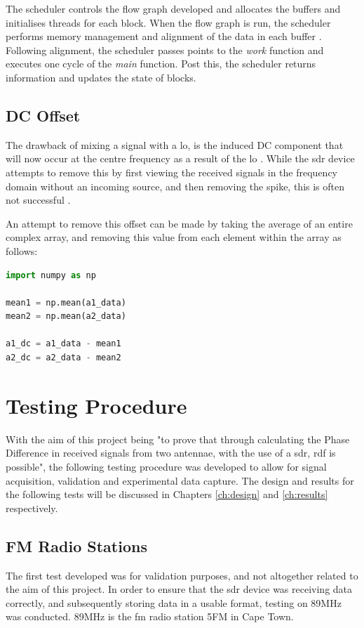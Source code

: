\documentclass[class=report,11pt,crop=false]{standalone}
\begin{document}
The scheduler controls the flow graph developed and allocates the buffers and initialises threads for each block. When the flow graph is run, the scheduler performs memory management and alignment of the data in each buffer \cite{gnu-delays}. Following alignment, the scheduler passes points to the \emph{work} function and executes one cycle of the \emph{main} function. Post this, the scheduler returns information and updates the state of blocks. 

\subsection{DC Offset}
The drawback of mixing a signal with a \gls{lo}, is the induced DC component that will now occur at the centre frequency as a result of the \gls{lo} \cite{sdr-for-engineers}. While the \gls{sdr} device attempts to remove this by first viewing the received signals in the frequency domain without an incoming source, and then removing the spike, this is often not successful \cite{sdr-for-engineers}. 

An attempt to remove this offset can be made by taking the average of an entire complex array, and removing this value from each element within the array as follows:
\begin{lstlisting}[language=Python, caption=Python code to remove DC value from LO, label={lst-dc}]
import numpy as np

mean1 = np.mean(a1_data)
mean2 = np.mean(a2_data)

a1_dc = a1_data - mean1
a2_dc = a2_data - mean2 
\end{lstlisting}

\section{Testing Procedure}
With the aim of this project being "to prove that through calculating the Phase Difference in received signals from two antennae, with the use of a \gls{sdr}, \gls{rdf} is possible", the following testing procedure was developed to allow for signal acquisition, validation and experimental data capture. 
The design and results for the following tests will be discussed in Chapters \ref{ch:design} and \ref{ch:results} respectively.

\subsection{FM Radio Stations}
The first test developed was for validation purposes, and not altogether related to the aim of this project. In order to ensure that the \gls{sdr} device was receiving data correctly, and subsequently storing data in a usable format, testing on 89MHz was conducted. 89MHz is the \gls{fm} radio station 5FM in Cape Town. 
\end{document}
